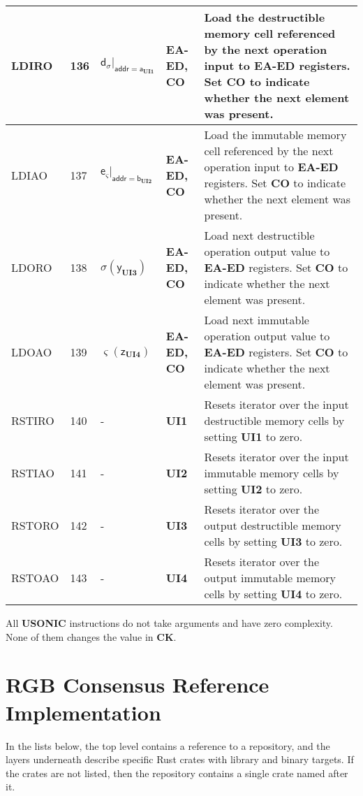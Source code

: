 \documentclass[9pt,oneside]{amsart}
\begin{document}
\begin{table}[h]
\begin{tabular}{l p{1cm} l p{1.5cm} p{9.3cm}}
LDIRO	&136	&$\mathsf{d}_\sigma|_{\mathsf{addr} = \mathsf{a}_\mathbf{UI1}}$	&\textbf{EA-ED, CO}	&Load the destructible memory cell referenced by the next operation input to \textbf{EA-ED} registers. Set \textbf{CO} to indicate whether the next element was present. \\ \midrule
LDIAO	&137	&$\mathsf{e}_\varsigma|_{\mathsf{addr} = \mathsf{b}_\mathbf{UI2}}$	&\textbf{EA-ED, CO}	&Load the immutable memory cell referenced by the next operation input to \textbf{EA-ED} registers. Set \textbf{CO} to indicate whether the next element was present. \\ \midrule
LDORO	&138	&$\sigma(\mathsf{y}_\mathbf{UI3})$	&\textbf{EA-ED, CO}	&Load next destructible operation output value to \textbf{EA-ED} registers. Set \textbf{CO} to indicate whether the next element was present. \\ \midrule
LDOAO	&139	&$\varsigma(\mathsf{z}_\mathbf{UI4})$	&\textbf{EA-ED, CO}	&Load next immutable operation output value to \textbf{EA-ED} registers. Set \textbf{CO} to indicate whether the next element was present. \\ \midrule
RSTIRO	&140	&-	&\textbf{UI1}	&Resets iterator over the input destructible memory cells by setting \textbf{UI1} to zero. \\ \midrule
RSTIAO	&141	&-	&\textbf{UI2}	&Resets iterator over the input immutable memory cells by setting \textbf{UI2} to zero. \\ \midrule
RSTORO	&142	&-	&\textbf{UI3}	&Resets iterator over the output destructible memory cells by setting \textbf{UI3} to zero. \\ \midrule
RSTOAO	&143	&-	&\textbf{UI4}	&Resets iterator over the output immutable memory cells by setting \textbf{UI4} to zero. \\
\bottomrule
\end{tabular}
\end{table}

All \textbf{USONIC} instructions do not take arguments and have zero complexity.
None of them changes the value in \textbf{CK}.


\newpage
\section{RGB Consensus Reference Implementation}\label{ap:impl}

In the lists below, the top level contains a reference to a repository,
and the layers underneath describe specific Rust crates with library and binary targets.
If the crates are not listed, then the repository contains a single crate named after it.
\end{document}
